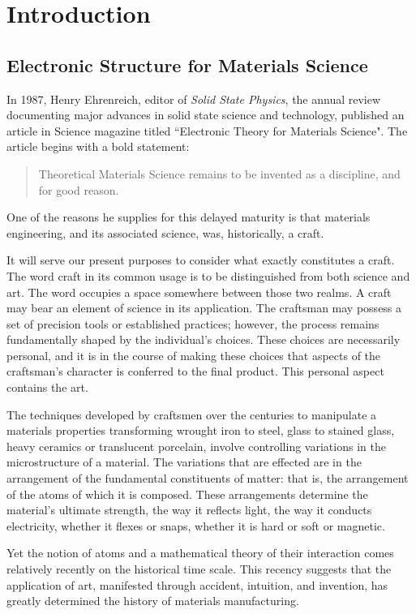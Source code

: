 \chapter{Introduction}
\section{Electronic Structure for Materials Science}
In 1987, Henry Ehrenreich, 
editor of \textit{Solid State Physics}, the annual review documenting major advances in
solid state science and technology, published an article in Science magazine titled 
``Electronic Theory for Materials Science"\cite{ehrenreich87}. The article begins
with a bold statement:
%
\begin{quote}
Theoretical Materials Science remains to be invented as a discipline, and for good reason.
\end{quote}
%
One of the reasons he supplies for this delayed maturity is that materials engineering, 
and its associated science, was, historically, a craft.

It will serve our present purposes to consider what exactly constitutes a craft. 
The word craft in its common usage is to be distinguished from both science and art.
The word occupies a space somewhere between those two realms. 
A craft may bear an element of science in its application. 
The craftsman may possess a set of precision tools or 
established practices; however, the process remains fundamentally shaped by 
the individual's choices. These choices are necessarily personal,
and it is in the course of making these choices that aspects 
of the craftsman's character is conferred to the final product. This
personal aspect contains the art.

The techniques developed by craftsmen over the centuries to manipulate a
materials properties transforming wrought iron to steel, glass to stained glass, 
heavy ceramics or translucent porcelain, involve controlling variations in the microstructure of a material. 
The variations that are effected are in the arrangement of the fundamental constituents of matter:
that is, the arrangement of the atoms of which it is composed. These 
arrangements determine the material's ultimate 
strength, the way it reflects light, the way it conducts electricity, 
whether it flexes or snaps, whether it is hard or soft or magnetic.

Yet the notion of atoms and a mathematical theory of their interaction comes relatively
recently on the historical time scale. This recency suggests that the application of 
art, manifested through accident, intuition, and invention, has greatly determined the history
of materials manufacturing.

